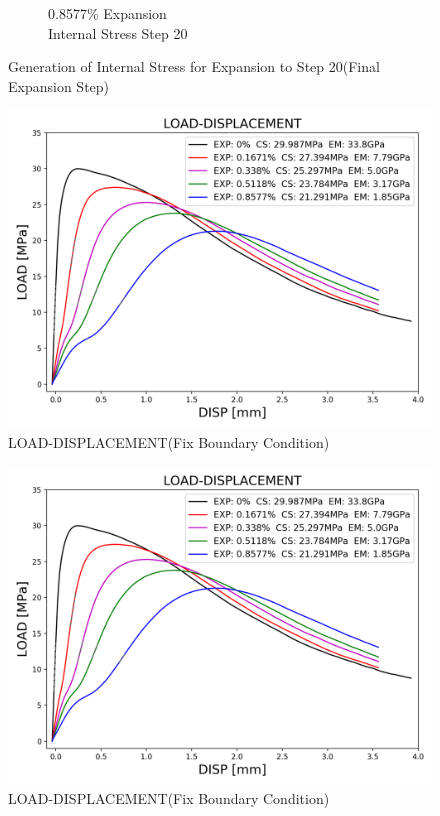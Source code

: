 \begin{figure}[ht!]
\begin{subfigure}{.25\textwidth}
      \caption{0.8577\% Expansion\\Internal Stress Step 20}
    \end{subfigure}

\caption{Generation of Internal Stress for Expansion to Step 20(Final Expansion Step)}
\label{fig:A30_stress}
\end{figure}

\begin{figure}[ht!]
    \centering
    \includegraphics[width=0.8\linewidth]{Files/exp_3D/DEF/S13A30FIXX-5-LOAD-DISPLACEMENT.png}
    \caption{LOAD-DISPLACEMENT(Fix Boundary Condition)}
    \label{fig:S13A15FIXX-5-LOAD-DISPLACEMENT}
\end{figure}


\begin{figure}[ht!]
    \centering
    \includegraphics[width=0.8\linewidth]{Files/exp_3D/DEF/S13A30FIXX-5-LOAD-DISPLACEMENT.png}
    \caption{LOAD-DISPLACEMENT(Fix Boundary Condition)}
    \label{fig:S13A30X-5CFIX-LOAD-DISPLACEMENT}
\end{figure}

